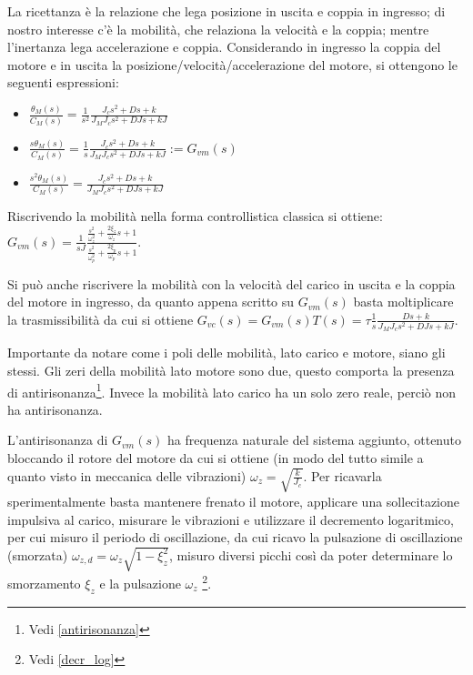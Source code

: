 La ricettanza è la relazione che lega posizione in uscita e coppia in ingresso; di nostro interesse c'è la mobilità, che relaziona la velocità e la coppia; mentre l'inertanza lega accelerazione e coppia.
Considerando in ingresso la coppia del motore e in uscita la posizione/velocità/accelerazione del motore, si ottengono le seguenti espressioni:
\begin{itemize}
    \item \(\frac{\theta_M(s)}{C_M(s)} = \frac{1}{s^2} \frac{J_c s^2 + D s + k}{J_M J_c s^2 + D J s + k J} \)
    \item \(\frac{s \theta_M(s)}{C_M(s)} = \frac{1}{s} \frac{J_c s^2 + D s + k}{J_M J_c s^2 + D J s + k J} := G_{vm}(s) \)
    \item \(\frac{s^2 \theta_M(s)}{C_M(s)} = \frac{J_c s^2 + D s + k}{J_M J_c s^2 + D J s + k J} \)
\end{itemize}

Riscrivendo la mobilità nella forma controllistica classica si ottiene:
\(G_{vm}(s) = \frac{1}{sJ} \frac{\frac{s^2}{\omega_z^2} + \frac{2\xi_z}{\omega_z} s + 1}{\frac{s^2}{\omega_p^2} + \frac{2\xi_p}{\omega_p} s + 1}\).

Si può anche riscrivere la mobilità con la velocità del carico in uscita e la coppia del motore in ingresso, da quanto appena scritto su \(G_{vm}(s)\) basta moltiplicare la trasmissibilità da cui si ottiene \(G_{vc}(s) = G_{vm}(s) T(s) = \tau \frac{1}{s} \frac{D s + k}{J_M J_c s^2 + D J s + k J}\).

Importante da notare come i poli delle mobilità, lato carico e motore, siano gli stessi.
Gli zeri della mobilità lato motore sono due, questo comporta la presenza di antirisonanza\footnote{Vedi \ref{antirisonanza}}. Invece la mobilità lato carico ha un solo zero reale, perciò non ha antirisonanza.

L'antirisonanza di \(G_{vm}(s)\) ha frequenza naturale del sistema aggiunto, ottenuto bloccando il rotore del motore da cui si ottiene (in modo del tutto simile a quanto visto in meccanica delle vibrazioni) \(\omega_z=\sqrt{\frac{k}{J_c}}\).
Per ricavarla sperimentalmente basta mantenere frenato il motore, applicare una sollecitazione impulsiva al carico, misurare le vibrazioni e utilizzare il decremento logaritmico, per cui misuro il periodo di oscillazione, da cui ricavo la pulsazione di oscillazione (smorzata) \(\omega_{z,d} = \omega_z \sqrt{1-\xi_z^2}\), misuro diversi picchi così da poter determinare lo smorzamento \(\xi_z\) e la pulsazione \(\omega_z\) \footnote{Vedi \ref{decr_log}}.

